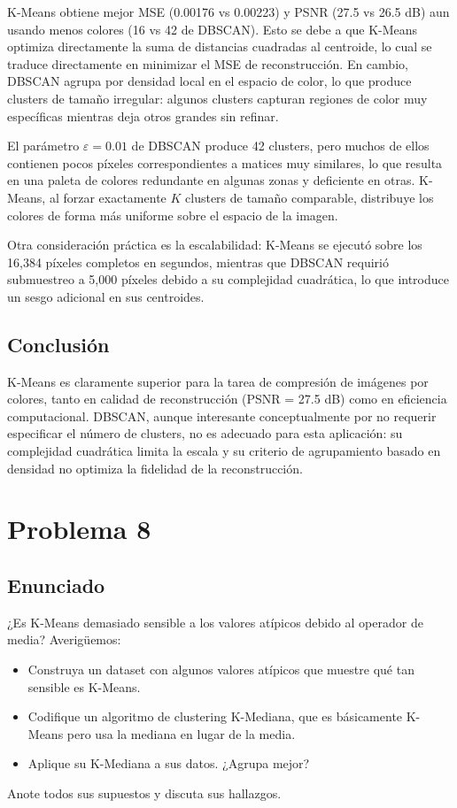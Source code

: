 \documentclass{article}
\begin{document}
K-Means obtiene mejor MSE (0.00176 vs 0.00223) y PSNR (27.5 vs 26.5 dB) aun usando menos colores (16 vs 42 de DBSCAN). Esto se debe a que K-Means optimiza directamente la suma de distancias cuadradas al centroide, lo cual se traduce directamente en minimizar el MSE de reconstrucción. En cambio, DBSCAN agrupa por densidad local en el espacio de color, lo que produce clusters de tamaño irregular: algunos clusters capturan regiones de color muy específicas mientras deja otros grandes sin refinar.

El parámetro $\varepsilon = 0.01$ de DBSCAN produce 42 clusters, pero muchos de ellos contienen pocos píxeles correspondientes a matices muy similares, lo que resulta en una paleta de colores redundante en algunas zonas y deficiente en otras. K-Means, al forzar exactamente $K$ clusters de tamaño comparable, distribuye los colores de forma más uniforme sobre el espacio de la imagen.

Otra consideración práctica es la escalabilidad: K-Means se ejecutó sobre los 16,384 píxeles completos en segundos, mientras que DBSCAN requirió submuestreo a 5,000 píxeles debido a su complejidad cuadrática, lo que introduce un sesgo adicional en sus centroides.

\subsection{Conclusión}

K-Means es claramente superior para la tarea de compresión de imágenes por colores, tanto en calidad de reconstrucción (PSNR = 27.5 dB) como en eficiencia computacional. DBSCAN, aunque interesante conceptualmente por no requerir especificar el número de clusters, no es adecuado para esta aplicación: su complejidad cuadrática limita la escala y su criterio de agrupamiento basado en densidad no optimiza la fidelidad de la reconstrucción.


\section{Problema 8}

\subsection{Enunciado}

¿Es K-Means demasiado sensible a los valores atípicos debido al operador de media? Averigüemos:
\begin{itemize}
    \item [a)] Construya un dataset con algunos valores atípicos que muestre qué tan sensible es K-Means.
    \item [b)] Codifique un algoritmo de clustering K-Mediana, que es básicamente K-Means pero usa la mediana en lugar de la media.
    \item [c)] Aplique su K-Mediana a sus datos. ¿Agrupa mejor?
\end{itemize}
Anote todos sus supuestos y discuta sus hallazgos.
\end{document}
